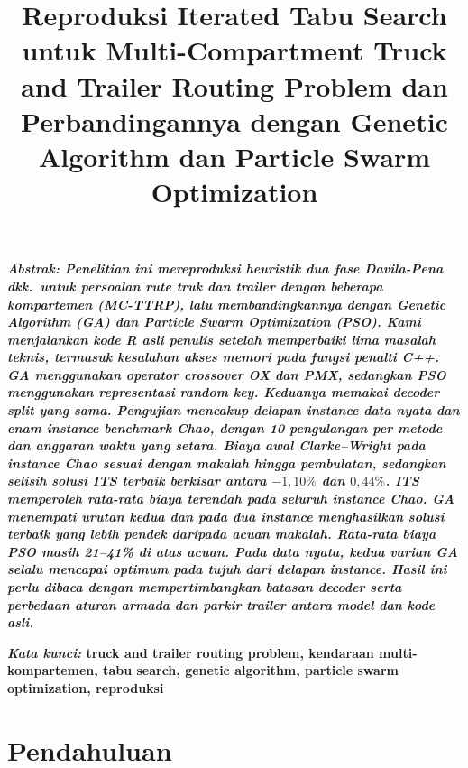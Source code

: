 \documentclass[conference]{IEEEtran}
\makeatletter
\renewcommand{\IEEEkeywordsname}{Kata kunci}
\renewcommand{\abstractname}{Abstrak}
\renewenvironment{IEEEkeywords}{\normalfont\@IEEEabskeysecsize\bfseries\noindent\textit{\IEEEkeywordsname:}\space}{\par\normalfont\normalsize}
\renewenvironment{abstract}{\normalfont\@IEEEabskeysecsize\bfseries\itshape\noindent\textit{\abstractname:}\space}{\par\normalfont\normalsize}
\makeatother
\begin{document}
\title{Reproduksi Iterated Tabu Search untuk Multi-Compartment Truck and Trailer Routing Problem dan Perbandingannya dengan Genetic Algorithm dan Particle Swarm Optimization}

\author{
\and
{}
}

\maketitle

\begin{abstract}
Penelitian ini mereproduksi heuristik dua fase Davila-Pena dkk.\ untuk persoalan rute truk dan trailer dengan beberapa kompartemen (MC-TTRP), lalu membandingkannya dengan Genetic Algorithm (GA) dan Particle Swarm Optimization (PSO). Kami menjalankan kode R asli penulis setelah memperbaiki lima masalah teknis, termasuk kesalahan akses memori pada fungsi penalti C++. GA menggunakan operator crossover OX dan PMX, sedangkan PSO menggunakan representasi random key. Keduanya memakai decoder split yang sama. Pengujian mencakup delapan instance data nyata dan enam instance benchmark Chao, dengan 10 pengulangan per metode dan anggaran waktu yang setara. Biaya awal Clarke--Wright pada instance Chao sesuai dengan makalah hingga pembulatan, sedangkan selisih solusi ITS terbaik berkisar antara $-1{,}10\%$ dan $0{,}44\%$. ITS memperoleh rata-rata biaya terendah pada seluruh instance Chao. GA menempati urutan kedua dan pada dua instance menghasilkan solusi terbaik yang lebih pendek daripada acuan makalah. Rata-rata biaya PSO masih 21--41\% di atas acuan. Pada data nyata, kedua varian GA selalu mencapai optimum pada tujuh dari delapan instance. Hasil ini perlu dibaca dengan mempertimbangkan batasan decoder serta perbedaan aturan armada dan parkir trailer antara model dan kode asli.
\end{abstract}

\begin{IEEEkeywords}
truck and trailer routing problem, kendaraan multi-kompartemen, tabu search, genetic algorithm, particle swarm optimization, reproduksi
\end{IEEEkeywords}

\section{Pendahuluan}
\end{document}
